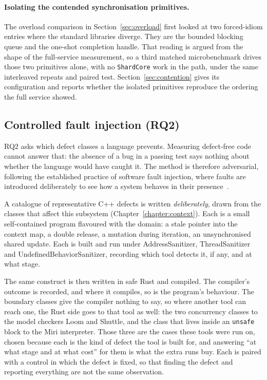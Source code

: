 \documentclass[english,oneside,a4paper,censored,csm,software-track-2020]{HYthesisML}
\begin{document}
\paragraph{Isolating the contended synchronisation primitives.}
The overload comparison in Section~\ref{sec:overload} first looked at two forced-idiom
entries where the standard libraries diverge. They are the bounded blocking queue and the
one-shot completion handle. That reading is argued from the shape of the full-service
measurement, so a third matched microbenchmark drives those two primitives alone, with no
\texttt{ShardCore} work in the path, under the same interleaved repeats and paired test.
Section~\ref{sec:contention} gives its configuration and reports whether the isolated primitives
reproduce the ordering the full service showed.

\subsection{Controlled fault injection (RQ2)}\label{sec:methodfaults}
RQ2 asks which defect classes a language prevents. Measuring defect-free code cannot answer
that: the absence of a bug in a passing test says nothing about whether the language would have
caught it. The method is therefore adversarial, following the established practice of software
fault injection, where faults are introduced deliberately to see how a system behaves in their
presence~\cite{natella2016fault}.

A catalogue of representative C++ defects is written \emph{deliberately}, drawn from the classes
that affect this subsystem (Chapter~\ref{chapter:context}). Each is a small self-contained
program flavoured with the domain: a stale pointer into the context map, a double release, a
mutation during iteration, an unsynchronised shared update. Each is built and run under
AddressSanitizer, ThreadSanitizer and UndefinedBehaviorSanitizer, recording which tool detects
it, if any, and at what stage.

The same construct is then written in safe Rust and compiled. The compiler's outcome is
recorded, and where it compiles, so is the program's behaviour. The boundary classes give the
compiler nothing to say, so where another tool can reach one, the Rust side goes to that tool as
well: the two concurrency classes to the model checkers Loom and Shuttle, and the class that lives
inside an \texttt{unsafe} block to the Miri interpreter. Those three are the cases these tools were
run on, chosen because each is the kind of defect the tool is built for, and answering ``at what
stage and at what cost'' for them is what the extra runs buy. Each is paired with a control in which
the defect is fixed, so that finding the defect and reporting everything are not the same
observation.
\end{document}
